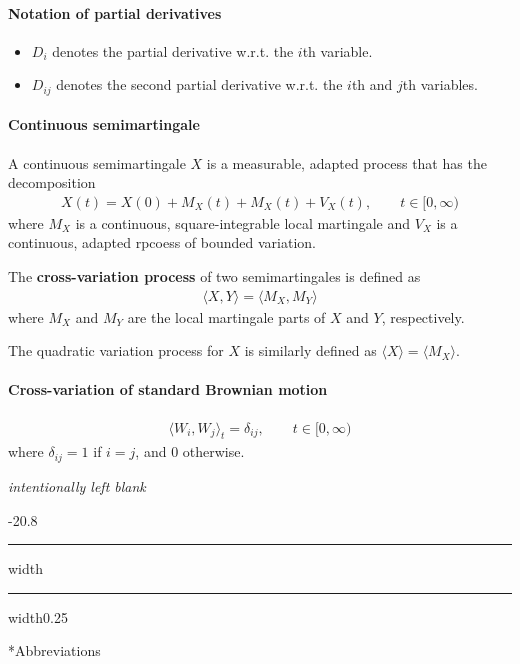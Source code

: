 \documentclass[a4paper,landscape,8pt,fleqn]{scrartcl}
\makeatletter
\renewcommand{\emph}[1]{\textbf{#1}}
\renewcommand{\section}{\@startsection{section}{1}{0mm}%
{-2\baselineskip}{0.8\baselineskip}%
{\hrule depth 0.2pt width\columnwidth\hrule depth1.5pt
width0.25\columnwidth\vspace*{1.2em}\Large\bfseries}}
\makeatother
\begin{document}
\begin{multicols*}{3}
\paragraph{Notation of partial derivatives}

\begin{itemize}
\item $D_i$ denotes the partial derivative w.r.t. the $i$th variable.
\item $D_{i j}$ denotes the second partial derivative w.r.t. the $i$th and $j$th variables.
\end{itemize}

\paragraph{Continuous semimartingale}

A continuous semimartingale $X$ is a measurable, adapted process that has the decomposition
\begin{align*}
X(t) = X(0) + M_X(t) + M_X(t) + V_X(t), \qquad t \in [0,\infty)
\end{align*}
where $M_X$ is a continuous, square-integrable local martingale and $V_X$ is a continuous, adapted rpcoess of bounded variation.

The \emph{cross-variation process} of two semimartingales is defined as
\begin{align*}
\langle X,Y \rangle = \langle M_X,M_Y \rangle
\end{align*}
where $M_X$ and $M_Y$ are the local martingale parts of $X$ and $Y$, respectively.

The quadratic variation process for $X$ is similarly defined as $\langle X \rangle = \langle M_X \rangle$.

\paragraph{Cross-variation of standard Brownian motion}

\begin{align*}
\langle W_i,W_j \rangle_t = \delta_{ij}, \qquad t \in [0,\infty)
\end{align*}
where $\delta_{ij} = 1$ if $i=j$, and $0$ otherwise.

\columnbreak
\begin{center}
\textit{intentionally left blank}
\end{center}
\vfill

\section*{Abbreviations}


\end{multicols*}
\end{document}
